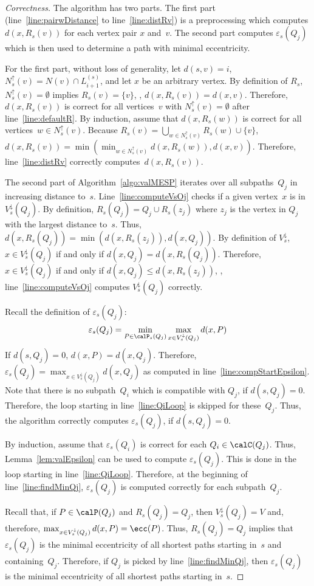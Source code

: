\begin{proof}
    [Correctness]
The algorithm has two parts.
The first part (line~\ref{line:pairwDistance} to line~\ref{line:distRv}) is a preprocessing which computes $d(x, R_s(v))$ for each vertex pair $x$ and~$v$.
The second part computes $\varepsilon_s(Q_j)$ which is then used to determine a path with minimal eccentricity.

For the first part, without loss of generality, let $d(s, v) = i$, $N^\uparrow_s(v) = N(v) \cap L_{i+1}^{(s)}$, and let $x$ be an arbitrary vertex.
By definition of $R_s$, $N^\uparrow_s(v) = \emptyset$ implies $R_s(v) = \{ v \}$, \ie, $d(x, R_s(v)) = d(x, v)$.
Therefore, $d(x, R_s(v))$ is correct for all vertices~$v$ with $N^\uparrow_s(v) = \emptyset$ after line~\ref{line:defaultR}.
By induction, assume that $d(x, R_s(w))$ is correct for all vertices~$w \in N^\uparrow_s(v)$.
Because $R_s(v) = \bigcup_{w \in N^\uparrow_s(v)} R_s(w) \cup \{ v \}$, $d(x, R_s(v)) = \min(\min_{w \in N^\uparrow_s(v)} d(x, R_s(w)), d(x, v))$.
Therefore, line~\ref{line:distRv} correctly computes~$d(x, R_s(v))$.

The second part of Algorithm~\ref{algo:valMESP} iterates over all subpaths~$Q_j$ in increasing distance to~$s$.
Line~\ref{line:computeVsOj} checks if a given vertex~$x$ is in $V^\downarrow_s(Q_j)$.
By definition, $R_s(Q_j) = Q_j \cup R_s(z_j)$ where $z_j$ is the vertex in $Q_j$ with the largest distance to~$s$.
Thus, $d(x, R_s(Q_j)) = \min( d(x, R_s(z_j)), d(x, Q_j))$.
By definition of $V^\downarrow_s$, $x \in V^\downarrow_s(Q_j)$ if and only if $d(x, Q_j) = d(x, R_s(Q_j))$.
Therefore, $x \in V^\downarrow_s(Q_j)$ if and only if $d(x, Q_j) \leq d(x, R_s(z_j))$, \ie, line~\ref{line:computeVsOj} computes $V^\downarrow_s(Q_j)$ correctly.

Recall the definition of $\varepsilon_s(Q_j)$:
\[
    \varepsilon_s(Q_j) = \min_{P \in \calP_s(Q_j)} \max_{x \in V^\downarrow_s(Q_j)} d(x, P)
\]
If $d(s, Q_j) = 0$, $d(x, P) = d(x, Q_j)$.
Therefore, $\varepsilon_s(Q_j) = \max_{x \in V^\downarrow_s(Q_j)} d(x, Q_j)$ as computed in line~\ref{line:compStartEpsilon}.
Note that there is no subpath~$Q_i$ which is compatible with $Q_j$, if $d(s, Q_j) = 0$.
Therefore, the loop starting in line~\ref{line:QiLoop} is skipped for these~$Q_j$.
Thus, the algorithm correctly computes $\varepsilon_s(Q_j)$, if $d(s, Q_j) = 0$.

By induction, assume that $\varepsilon_s(Q_i)$ is correct for each $Q_i \in \calC(Q_j)$.
Thus, Lemma~\ref{lem:valEpsilon} can be used to compute $\varepsilon_s(Q_j)$.
This is done in the loop starting in line~\ref{line:QiLoop}.
Therefore, at the beginning of line~\ref{line:findMinQj}, $\varepsilon_s(Q_j)$ is computed correctly for each subpath~$Q_j$.

Recall that, if $P \in \calP(Q_j)$ and $R_s(Q_j) = Q_j$, then $V^\downarrow_s(Q_j) = V$ and, therefore, $\max_{x \in V^\downarrow_s(Q_j)} d(x, P) = \ecc(P)$.
Thus, $R_s(Q_j) = Q_j$ implies that $\varepsilon_s(Q_j)$ is the minimal eccentricity of all shortest paths starting in~$s$ and containing~$Q_j$.
Therefore, if $Q_j$ is picked by line~\ref{line:findMinQj}, then $\varepsilon_s(Q_j)$ is the minimal eccentricity of all shortest paths starting in~$s$.
\end{proof}

